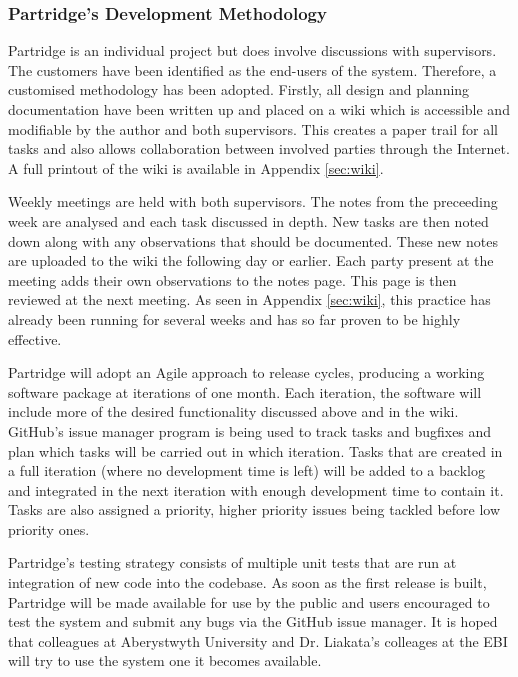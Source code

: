\documentclass[12pt,a4paper]{article}
\begin{document}
\subsubsection{ Partridge's Development Methodology}

Partridge is an individual project but does involve discussions with
supervisors. The customers have been identified as the end-users of the system.
Therefore, a customised methodology has been adopted. Firstly, all design and
planning documentation have been written up and placed on a wiki which is
accessible and modifiable by the author and both supervisors. This creates a
paper trail for all tasks and also allows collaboration between involved
parties through the Internet. A full printout of the wiki is available in
Appendix \ref{sec:wiki}. 

Weekly meetings are held with both supervisors. The notes from the preceeding
week are analysed and each task discussed in depth. New tasks are then noted
down along with any observations that should be documented. These new notes are
uploaded to the wiki the following day or earlier. Each party present at the
meeting adds their own observations to the notes page. This page is then
reviewed at the next meeting. As seen in Appendix \ref{sec:wiki}, this practice
has already been running for several weeks and has so far proven to be highly
effective.

Partridge will adopt an Agile approach to release cycles, producing a working
software package at iterations of one month.  Each iteration, the software will
include more of the desired functionality discussed above and in the wiki.
GitHub's issue manager program is being used to track tasks and bugfixes and
plan which tasks will be carried out in which iteration. Tasks that are created
in a full iteration (where no development time is left) will be added to a
backlog and integrated in the next iteration with enough development time to
contain it. Tasks are also assigned a priority, higher priority issues being
tackled before low priority ones.

Partridge's testing strategy consists of multiple unit tests that are run at
integration of new code into the codebase. As soon as the first release is
built, Partridge will be made available for use by the public and users
encouraged to test the system and submit any bugs via the GitHub issue manager.
It is hoped that colleagues at Aberystwyth University and Dr. Liakata's
colleages at the EBI will try to use the system one it becomes available.
\end{document}
